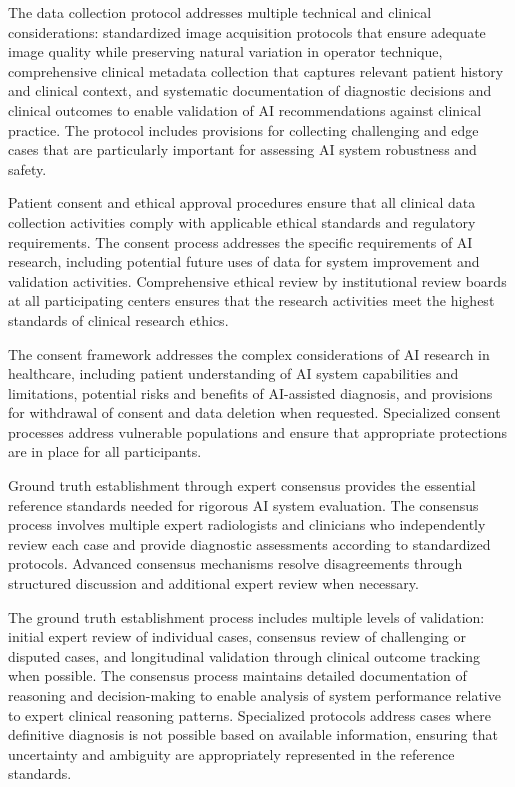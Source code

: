 The data collection protocol addresses multiple technical and clinical considerations: standardized image acquisition protocols that ensure adequate image quality while preserving natural variation in operator technique, comprehensive clinical metadata collection that captures relevant patient history and clinical context, and systematic documentation of diagnostic decisions and clinical outcomes to enable validation of AI recommendations against clinical practice. The protocol includes provisions for collecting challenging and edge cases that are particularly important for assessing AI system robustness and safety.

Patient consent and ethical approval procedures ensure that all clinical data collection activities comply with applicable ethical standards and regulatory requirements. The consent process addresses the specific requirements of AI research, including potential future uses of data for system improvement and validation activities. Comprehensive ethical review by institutional review boards at all participating centers ensures that the research activities meet the highest standards of clinical research ethics.

The consent framework addresses the complex considerations of AI research in healthcare, including patient understanding of AI system capabilities and limitations, potential risks and benefits of AI-assisted diagnosis, and provisions for withdrawal of consent and data deletion when requested. Specialized consent processes address vulnerable populations and ensure that appropriate protections are in place for all participants.

Ground truth establishment through expert consensus provides the essential reference standards needed for rigorous AI system evaluation. The consensus process involves multiple expert radiologists and clinicians who independently review each case and provide diagnostic assessments according to standardized protocols. Advanced consensus mechanisms resolve disagreements through structured discussion and additional expert review when necessary.

The ground truth establishment process includes multiple levels of validation: initial expert review of individual cases, consensus review of challenging or disputed cases, and longitudinal validation through clinical outcome tracking when possible. The consensus process maintains detailed documentation of reasoning and decision-making to enable analysis of system performance relative to expert clinical reasoning patterns. Specialized protocols address cases where definitive diagnosis is not possible based on available information, ensuring that uncertainty and ambiguity are appropriately represented in the reference standards.

